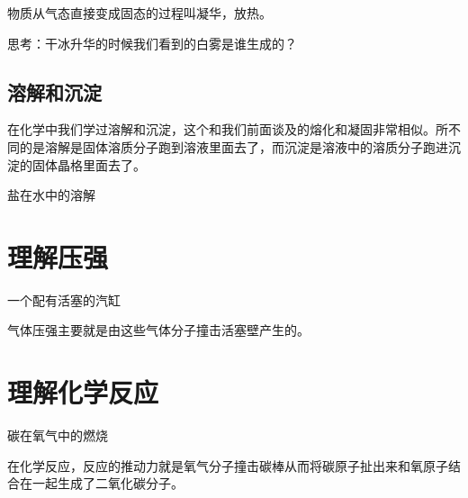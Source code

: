\documentclass[12pt]{exam}
\begin{document}
物质从气态直接变成固态的过程叫凝华，放热。

思考：干冰升华的时候我们看到的白雾是谁生成的？

\subsection{溶解和沉淀}
在化学中我们学过溶解和沉淀，这个和我们前面谈及的熔化和凝固非常相似。所不同的是溶解是固体溶质分子跑到溶液里面去了，而沉淀是溶液中的溶质分子跑进沉淀的固体晶格里面去了。
\begin{fig}{盐在水中的溶解}
\end{fig}


\section{理解压强}
\begin{fig}{一个配有活塞的汽缸}
\end{fig}

气体压强主要就是由这些气体分子撞击活塞壁产生的。

\section{理解化学反应}
\begin{fig}{碳在氧气中的燃烧}
\end{fig}

在化学反应\chemrel[点火]{->}，反应的推动力就是氧气分子撞击碳棒从而将碳原子扯出来和氧原子结合在一起生成了二氧化碳分子。
\end{document}
